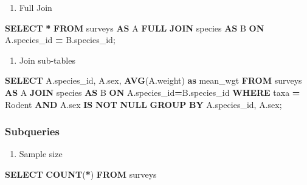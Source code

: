 \documentclass[
]{book}
\newenvironment{Shaded}{\begin{snugshade}}{\end{snugshade}}
\newcommand{\FunctionTok}[1]{\textcolor[rgb]{0.13,0.29,0.53}{\textbf{#1}}}
\newcommand{\KeywordTok}[1]{\textcolor[rgb]{0.13,0.29,0.53}{\textbf{#1}}}
\newcommand{\NormalTok}[1]{#1}
\newcommand{\OperatorTok}[1]{\textcolor[rgb]{0.81,0.36,0.00}{\textbf{#1}}}
\newcommand{\StringTok}[1]{\textcolor[rgb]{0.31,0.60,0.02}{#1}}
\providecommand{\tightlist}{%
  \setlength{\itemsep}{0pt}\setlength{\parskip}{0pt}}
\begin{document}
\begin{enumerate}
\def\labelenumi{\arabic{enumi}.}
\setcounter{enumi}{3}
\tightlist
\item
  Full Join
\end{enumerate}

\begin{Shaded}
\begin{Highlighting}[]
\KeywordTok{SELECT} \OperatorTok{*}
\KeywordTok{FROM}\NormalTok{ surveys }\KeywordTok{AS}\NormalTok{ A}
\KeywordTok{FULL} \KeywordTok{JOIN}\NormalTok{ species }\KeywordTok{AS}\NormalTok{ B}
\KeywordTok{ON}\NormalTok{ A.species\_id }\OperatorTok{=}\NormalTok{ B.species\_id;}
\end{Highlighting}
\end{Shaded}

\begin{enumerate}
\def\labelenumi{\arabic{enumi}.}
\setcounter{enumi}{4}
\tightlist
\item
  Join sub-tables
\end{enumerate}

\begin{Shaded}
\begin{Highlighting}[]
\KeywordTok{SELECT}\NormalTok{ A.species\_id, }
\NormalTok{       A.sex, }
       \FunctionTok{AVG}\NormalTok{(A.weight) }\KeywordTok{as}\NormalTok{ mean\_wgt  }
\KeywordTok{FROM}\NormalTok{ surveys }\KeywordTok{AS}\NormalTok{ A}
\KeywordTok{JOIN}\NormalTok{ species }\KeywordTok{AS}\NormalTok{ B}
\KeywordTok{ON}\NormalTok{ A.species\_id}\OperatorTok{=}\NormalTok{B.species\_id }
\KeywordTok{WHERE}\NormalTok{ taxa }\OperatorTok{=} \StringTok{\textquotesingle{}Rodent\textquotesingle{}} \KeywordTok{AND}\NormalTok{ A.sex }\KeywordTok{IS} \KeywordTok{NOT} \KeywordTok{NULL} 
\KeywordTok{GROUP} \KeywordTok{BY}\NormalTok{ A.species\_id, A.sex; }
\end{Highlighting}
\end{Shaded}

\hypertarget{subqueries}{%
\subsubsection{Subqueries}\label{subqueries}}

\begin{enumerate}
\def\labelenumi{\arabic{enumi}.}
\tightlist
\item
  Sample size
\end{enumerate}

\begin{Shaded}
\begin{Highlighting}[]
\KeywordTok{SELECT} \FunctionTok{COUNT}\NormalTok{(}\OperatorTok{*}\NormalTok{) }
\KeywordTok{FROM}\NormalTok{ surveys}
\end{Highlighting}
\end{Shaded}
\end{document}
